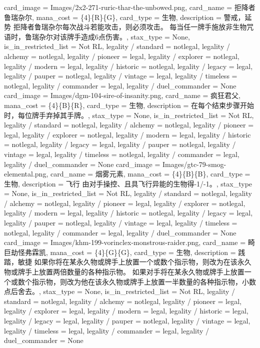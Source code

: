\documentclass[lang = cn, color = black, 10pt]{AllThatStax}
\begin{document}
\card
{
	card_image = Images/2x2-271-ruric-thar-the-unbowed.png,
	card_name = 拒降者鲁瑞杂尔,
	mana_cost = \{4\}\{R\}\{G\},
	card_type = 生物,
	description = 警戒，延势
	拒降者鲁瑞杂尔每次战斗若能攻击，则必须攻击。
	每当任一牌手施放非生物咒语时，鲁瑞杂尔对该牌手造成6点伤害。,
	stax_type = None,
	is_in_restricted_list = Not RL,
	legality / standard = notlegal,
	legality / alchemy = notlegal,
	legality / pioneer = legal,
	legality / explorer = notlegal,
	legality / modern = legal,
	legality / historic = notlegal,
	legality / legacy = legal,
	legality / pauper = notlegal,
	legality / vintage = legal,
	legality / timeless = notlegal,
	legality / commander = legal,
	legality / duel_commander = None
}
\card
{
	card_image = Images/dgm-104-sire-of-insanity.png,
	card_name = 疯狂君父,
	mana_cost = \{4\}\{B\}\{R\},
	card_type = 生物,
	description = 在每个结束步骤开始时，每位牌手弃掉其手牌。,
	stax_type = None,
	is_in_restricted_list = Not RL,
	legality / standard = notlegal,
	legality / alchemy = notlegal,
	legality / pioneer = legal,
	legality / explorer = notlegal,
	legality / modern = legal,
	legality / historic = notlegal,
	legality / legacy = legal,
	legality / pauper = notlegal,
	legality / vintage = legal,
	legality / timeless = notlegal,
	legality / commander = legal,
	legality / duel_commander = None
}
\card
{
	card_image = Images/gtc-79-smog-elemental.png,
	card_name = 烟雾元素,
	mana_cost = \{4\}\{B\}\{B\},
	card_type = 生物,
	description = 飞行
	由对手操控、且具飞行异能的生物得-1/-1。,
	stax_type = None,
	is_in_restricted_list = Not RL,
	legality / standard = notlegal,
	legality / alchemy = notlegal,
	legality / pioneer = legal,
	legality / explorer = notlegal,
	legality / modern = legal,
	legality / historic = notlegal,
	legality / legacy = legal,
	legality / pauper = notlegal,
	legality / vintage = legal,
	legality / timeless = notlegal,
	legality / commander = legal,
	legality / duel_commander = None
}
\card
{
	card_image = Images/khm-199-vorinclex-monstrous-raider.png,
	card_name = 畸巨劫怪弗霖凯,
	mana_cost = \{4\}\{G\}\{G\},
	card_type = 生物,
	description = 践踏，敏捷
	如果你将在某永久物或牌手上放置一个或数个指示物，则改为在该永久物或牌手上放置两倍数量的各种指示物。
	如果对手将在某永久物或牌手上放置一个或数个指示物，则改为他在该永久物或牌手上放置一半数量的各种指示物，小数点后舍去。,
	stax_type = None,
	is_in_restricted_list = Not RL,
	legality / standard = notlegal,
	legality / alchemy = notlegal,
	legality / pioneer = legal,
	legality / explorer = legal,
	legality / modern = legal,
	legality / historic = legal,
	legality / legacy = legal,
	legality / pauper = notlegal,
	legality / vintage = legal,
	legality / timeless = legal,
	legality / commander = legal,
	legality / duel_commander = None
}
\end{document}
